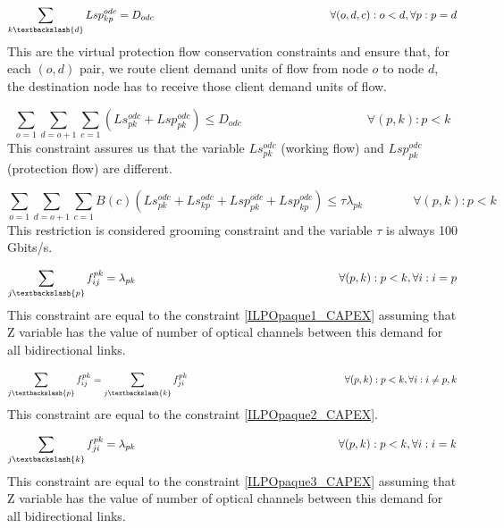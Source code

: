 \begin{equation}
\sum_{k\textbackslash \{d\}} Lsp_{kp}^{odc} = D_{odc} \qquad \qquad \qquad \qquad \qquad \qquad \qquad \qquad
\forall(o,d,c) : o < d, \forall p: p = d
\label{ILPTranslucp3p}
\end{equation}
\noindent
This are the virtual protection flow conservation constraints and ensure that, for each $(o,d)$ pair, we route client demand units of flow from node $o$ to node $d$, the destination node has to receive those client demand units of flow.

\begin{equation}
\sum_{o=1} \sum_{d=o+1} \sum_{c=1} (Ls_{pk}^{odc} + Lsp_{pk}^{odc}) \leq D_{odc} \qquad \qquad \qquad \qquad \qquad \forall (p,k) : p < k
\label{ILPTranslucpX}
\end{equation}
\noindent
This constraint assures us that the variable $Ls_{pk}^{odc}$ (working flow) and $Lsp_{pk}^{odc}$ (protection flow) are different.

\begin{equation}
\sum_{o=1} \sum_{d=o+1} \sum_{c=1} B(c)(Ls_{pk}^{odc} + Ls_{kp}^{odc} + Lsp_{pk}^{odc} + Lsp_{kp}^{odc}) \leq  \tau \lambda_{pk} \qquad \qquad
\forall (p,k) : p < k
\label{ILPTranslucp4}
\end{equation}
\noindent
This restriction is considered grooming constraint and the variable $\tau$ is always 100 Gbits/s.

\begin{equation}
\sum_{j\textbackslash \{p\}} f_{ij}^{pk} = \lambda_{pk}  \qquad \qquad \qquad \qquad \qquad \qquad \qquad \qquad \qquad
\forall(p,k) : p < k, \forall i: i = p
\label{ILPTranslucp6}
\end{equation}
\noindent
This constraint are equal to the constraint \ref{ILPOpaque1_CAPEX} assuming that Z variable has the value of number of optical channels between this demand for all bidirectional links.

\begin{equation}
\sum_{j\textbackslash \{p\}} f_{ij}^{pk} = \sum_{j\textbackslash \{k\}} f_{ji}^{pk} \qquad \qquad \qquad \qquad \qquad \qquad \qquad \qquad
\forall(p,k) : p < k, \forall i: i \neq p,k
\label{ILPTranslucp7}
\end{equation}
\noindent
This constraint are equal to the constraint \ref{ILPOpaque2_CAPEX}.

\begin{equation}
\sum_{j\textbackslash \{k\}} f_{ji}^{pk} = \lambda_{pk}  \qquad \qquad \qquad \qquad \qquad \qquad \qquad \qquad \qquad
\forall(p,k) : p < k, \forall i: i = k
\label{ILPTranslucp8}
\end{equation}
\noindent
This constraint are equal to the constraint \ref{ILPOpaque3_CAPEX} assuming that Z variable has the value of number of optical channels between this demand for all bidirectional links.

